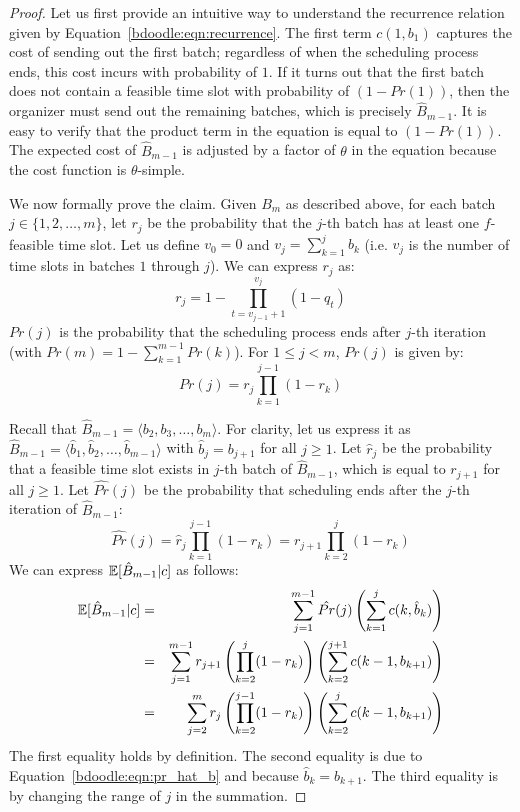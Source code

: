 \begin{proof}
Let us first provide an intuitive way to understand the recurrence relation given by Equation~\ref{bdoodle:eqn:recurrence}. The first term $c(1, b_1)$ captures the cost of sending out the first batch; regardless of when the scheduling process ends, this cost incurs with probability of $1$. If it turns out that the first batch does not contain a feasible time slot with probability of $(1 - Pr(1))$, then the organizer must send out the remaining batches, which is precisely $\hat{B}_{m-1}$. It is easy to verify that the product term in the equation is equal to $(1 - Pr(1))$. The expected cost of $\hat{B}_{m-1}$ is adjusted by a factor of $\theta$ in the equation because the cost function is $\theta$-simple. 

We now formally prove the claim. Given $B_{m}$ as described above, for each batch $j \in \{1, 2, \dots, m\}$, let $r_j$ be the probability that the $j$-th batch has at least one $f$-feasible time slot. Let us define $v_0 = 0$ and $v_j = \sum_{k=1}^{j} b_k$ (i.e. $v_j$ is the number of time slots in batches $1$ through $j$).
We can express $r_j$ as:
\begin{equation} \label{bdoodle:eqn:r_j}
r_j = 1 - \prod_{t=v_{j-1} + 1}^{v_j} (1 - q_t)
\end{equation}
$Pr(j)$ is the probability that the scheduling process ends after $j$-th iteration (with $Pr(m) = 1 - \sum_{k=1}^{m-1} Pr(k)$). For $1 \leq j < m$, $Pr(j)$ is given by:
\begin{equation} \label{bdoodle:eqn:Pr_j}
Pr(j) =  r_j  \prod_{k=1}^{j-1} (1 - r_k)   
\end{equation}
	
Recall that $\hat{B}_{m-1} = \langle b_2, b_3, \dots, b_{m} \rangle$. 
For clarity, let us express it as $\hat{B}_{m-1} = \langle \hat{b}_1, \hat{b}_2, \dots, \hat{b}_{m-1}\rangle$ with $\hat{b}_j = b_{j+1}$ for all $j\geq 1$. Let $\hat{r}_j$ be the probability that a feasible time slot exists in $j$-th batch of $\hat{B}_{m-1}$, which is equal to $r_{j+1}$ for all $j \geq 1$. Let $\hat{Pr}(j)$ be the probability that scheduling ends after the $j$-th iteration of $\hat{B}_{m-1}$:
\begin{equation}
	\hat{Pr}(j) 
	= \hat{r}_j \prod_{k=1}^{j-1} (1 - \hat{r}_k)
	= r_{j+1} \prod_{k=2}^{j} (1 - r_{k})  \label{bdoodle:eqn:pr_hat_b}
\end{equation}
We can express $\mathbb{E}[\hat{B}_{m-1}|c]$ as follows:
\begin{eqnarray*}
\mathbb{E}[\hat{B}_{m-1}|c]
&=& \sum_{j=1}^{m-1} \hat{Pr}(j) \left( \sum_{k=1}^{j} c(k, \hat{b}_k) \right) \\
&=& \sum_{j=1}^{m-1} r_{j+1} \left(\prod_{k=2}^{j} (1 - r_{k})\right) \left(\sum_{k=2}^{j+1} c(k-1, b_{k+1})\right) \\
&=& \sum_{j=2}^{m} r_{j} \left(\prod_{k=2}^{j-1} (1 - r_{k})\right) \left(\sum_{k=2}^{j} c(k-1, b_{k+1})\right)
\end{eqnarray*}
The first equality holds by definition. The second equality is due to Equation~\ref{bdoodle:eqn:pr_hat_b} and because $\hat{b}_k = b_{k+1}$. The third equality is by changing the range of $j$ in the summation. 


\end{proof}
